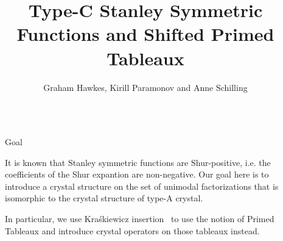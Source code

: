 \documentclass[final]{beamer}
\title{Type-C Stanley Symmetric Functions and Shifted Primed Tableaux} %
\author{Graham Hawkes, Kirill Paramonov and Anne Schilling} %
\institute{University of California, Davis} %
\theoremstyle{definition}
\numberwithin{equation}{section}
\newlength{\sepwid}
\newlength{\onecolwid}
\newlength{\twocolwid}
\begin{document}

\setlength{\belowcaptionskip}{2ex} %
\setlength\belowdisplayshortskip{2ex} %

\begin{frame}[t] %

\begin{columns}[t] %

\begin{column}{\sepwid}\end{column} %

\begin{column}{\twocolwid}\vspace{-.4in} %


\begin{alertblock}{Goal}

It is known that Stanley symmetric functions are Shur-positive, i.e. the coefficients of the Shur expantion are non-negative. 
Our goal here is to introduce a crystal structure on the set of unimodal factorizations that is isomorphic to the crystal structure of type-A crystal.

In particular, we use Kra\'skiewicz insertion~\cite{Kraskiewicz.1989,Kraskiewicz.1995} to use the notion of Primed Tableaux and introduce crystal operators on those tableaux instead.

\end{alertblock}



\begin{columns}[t]

\begin{column}{\onecolwid}\vspace{-.8in}



\end{column}
\end{columns}
\end{column}
\end{columns}
\end{frame}
\end{document}
